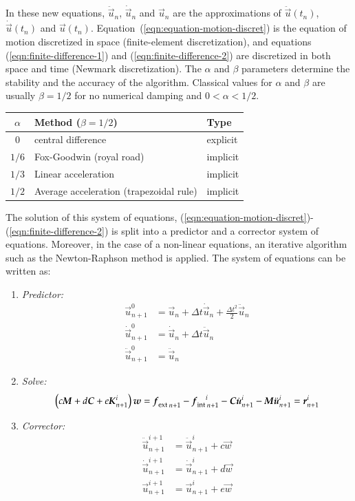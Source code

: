 In these new equations, $\ddot{\vec{u}}_{n}$, $\dot{\vec{u}}_{n}$ and
$\vec{u}_{n}$ are the approximations of $\ddot{\vec{u}}(t_n)$,
$\dot{\vec{u}}(t_n)$ and $\vec{u}(t_n)$.
Equation~(\ref{eqn:equation-motion-discret}) is the equation of motion
discretized in space (finite-element discretization), and equations
(\ref{eqn:finite-difference-1}) and (\ref{eqn:finite-difference-2})
are discretized in both space and time (Newmark discretization).  The
$\alpha$ and $\beta$ parameters determine the stability and the
accuracy of the algorithm. Classical values for $\alpha$ and $\beta$
are usually $\beta = 1/2$ for no numerical damping and $0 < \alpha <
1/2$.

\begin{center}
  \begin{tabular}{cll}
    \toprule
    $\alpha$ & Method ($\beta = 1/2$) & Type\\
    \midrule
    $0$ & central difference & explicit\\
    $1/6$ & Fox-Goodwin (royal road) &implicit\\
    $1/3$ & Linear acceleration &implicit\\
    $1/2$ & Average acceleration (trapezoidal rule)& implicit\\
    \bottomrule
  \end{tabular}
\end{center}

The solution of this system of equations,
(\ref{eqn:equation-motion-discret})-(\ref{eqn:finite-difference-2}) is
split into a predictor and a corrector system of equations.  Moreover,
in the case of a non-linear equations, an iterative algorithm such as
the Newton-Raphson method is applied. The system of equations can be
written as:

\begin{enumerate}
\item \textit{Predictor:}
\begin{align}
  \vec{u}_{n+1}^{0} &= \vec{u}_{n} + \Delta t
  \dot{\vec{u}}_{n} + \frac{\Delta t^2}{2} \ddot{\vec{u}}_{n} \\
  \dot{\vec{u}}_{n+1}^{0} &= \dot{\vec{u}}_{n} + \Delta t
  \ddot{\vec{u}}_{n} \\
  \ddot{\vec{u}}_{n+1}^{0} &= \ddot{\vec{u}}_{n}
\end{align}

\item \textit{Solve:}
\begin{align}
  \left(c \boldsymbol{M} + d \boldsymbol{C} + e \boldsymbol{K}_{n+1}^i\right)
  \boldsymbol{w} = {\boldsymbol{f}_{{\mathrm{ext}}}}_{\,n+1} - {\boldsymbol{f}_{{\mathrm{int}}}}_{\,n+1}^i -
  \boldsymbol{C} \dot{\boldsymbol{u}}_{n+1}^i - \boldsymbol{M} \ddot{\boldsymbol{u}}_{n+1}^i = \boldsymbol{r}_{n+1}^i
\end{align}

\item \textit{Corrector:}
\begin{align}
  \ddot{\vec{u}}_{n+1}^{i+1} &= \ddot{\vec{u}}_{n+1}^{i} +c \vec{w} \\
  \dot{\vec{u}}_{n+1}^{i+1} &= \dot{\vec{u}}_{n+1}^{i} + d\vec{w} \\
  \vec{u}_{n+1}^{i+1} &= \vec{u}_{n+1}^{i} + e \vec{w}
\end{align}
\end{enumerate}

